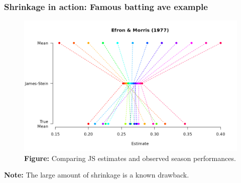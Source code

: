 \documentclass[18pt]{beamer}
\begin{document}
\begin{frame}
\frametitle{Shrinkage in action: Famous batting ave example}
\vspace*{-.5\baselineskip}
\begin{figure}
\centering
\includegraphics[width=.9\linewidth]{Figure/batting_ave_example_viz}
\vspace*{-.5\baselineskip}
\caption*{\textcolor{themecolor}{\textbf{Figure:}}
	Comparing JS estimates and observed season performances.%
}%
\end{figure}

\pause%
\vspace*{-.8\baselineskip}
\textbf{Note:} The large amount of shrinkage is a known drawback.
\end{frame}
\end{document}
